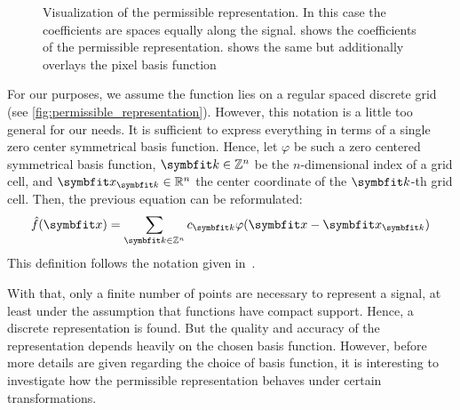 \begin{figure}
	\centering
	\caption{Visualization of the permissible representation. In this case the
		coefficients are spaces equally along the signal.
		 shows the coefficients of the
		permissible representation.  shows the
		same but additionally overlays the pixel basis function
	}\label{fig:permissible_representation}
\end{figure}

For our purposes, we assume the function lies on a regular spaced discrete grid (see
\autoref{fig:permissible_representation}). However, this notation is a little too general for our
needs. It is sufficient to express everything in terms of a single zero center symmetrical basis
function. Hence, let \(\varphi\) be such a zero centered symmetrical basis function, \(\mvec{k} \in
\mathbb{Z}^n\) be the \(n\)-dimensional index of a grid cell, and \(\mvec{x}_{\mvec{k}} \in
\mathbb{R}^n\) the center coordinate of the \(\mvec{k}\)-th grid cell. Then, the previous equation
can be reformulated:
\begin{equation}
	\near{f}(\mvec{x}) = \sum_{\mvec{k} \in \mathbb{Z}^n} c_{\mvec{k}} \varphi(\mvec{x} - \mvec{x}_{\mvec{k}})
\end{equation}
This definition follows the notation given in~\cite{momey_new_2011}.

With that, only a finite number of points are necessary to represent a signal, at least under the
assumption that functions have compact support. Hence, a discrete representation is found. But the
quality and accuracy of the representation depends heavily on the chosen basis function. However,
before more details are given regarding the choice of basis function, it is interesting to
investigate how the permissible representation behaves under certain transformations.

